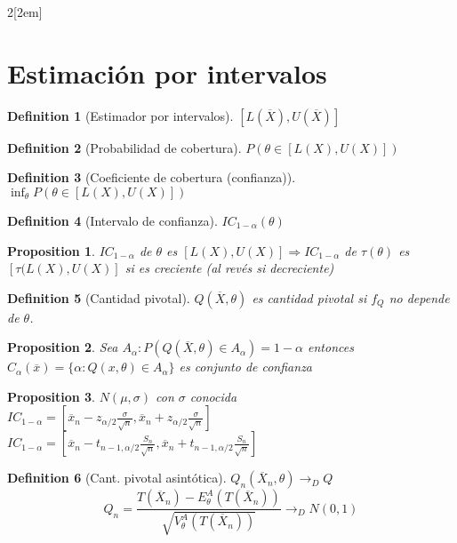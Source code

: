 \documentclass[leqno]{article}
\newtheorem*{proposition}{Proposition}
\newtheorem*{definition}{Definition}
\begin{document}
\begin{multicols}{2}[\columnsep2em]
\section{Estimación por intervalos}

\begin{definition}[Estimador por intervalos] $[L(\overline{X}), U(\overline{X})]$
\end{definition}

\begin{definition}[Probabilidad de cobertura]
$P(\theta \in [L(X), U(X)])$
\end{definition}

\begin{definition}[Coeficiente de cobertura (confianza)] 
$\inf_{\theta }P(\theta \in [L(X), U(X)])$
\end{definition}

\begin{definition}[Intervalo de confianza] $IC_{1-\alpha }(\theta)$
\end{definition}

\begin{proposition} 
  $IC_{1-\alpha }$ de $\theta$ es $[L(X), U(X)] \Rightarrow IC_{1-\alpha}$ de $\tau (\theta )$ es $[\tau (L(X), U(X)]$ si es creciente (al revés si decreciente)
\end{proposition}

\begin{definition}[Cantidad pivotal] $Q(\overline{X}, \theta )$ es cantidad pivotal si $f_Q$ no depende de  $\theta $.
\end{definition}

\begin{proposition}
  Sea $A_\alpha : P(Q(\overline{X}, \theta )\in A_\alpha) = 1-\alpha$ entonces $C_\alpha (\overline{x}) = \{\alpha : Q(x,\theta )\in A_\alpha \}$ es conjunto de confianza
\end{proposition}

\begin{proposition}$N(\mu, \sigma )$ con $\sigma $ conocida\\
  $IC_{1-\alpha } = [\overline{x}_n - z_{\alpha /2} \frac{\sigma }{\sqrt{n} }, \overline{x}_n + z_{\alpha /2} \frac{\sigma }{\sqrt{n} }]$ \\
  $IC_{1-\alpha } = [\overline{x}_n - t_{n-1,\alpha /2} \frac{S_n }{\sqrt{n} }, \overline{x}_n + t_{n-1,\alpha /2} \frac{S_n }{\sqrt{n} }]$
\end{proposition}

\begin{definition}[Cant. pivotal asintótica] $Q_n(\overline{X}_n, \theta ) \to_D Q$ 
  \[
  Q_n = \frac{T(\overline{X}_n) - E_{\theta }^A (T(\overline{X}_n))}{\sqrt{V_\theta ^A(T(\overline{X}_n))} } \to _D N(0,1)
  \] 
\end{definition}


\end{multicols}
\end{document}
